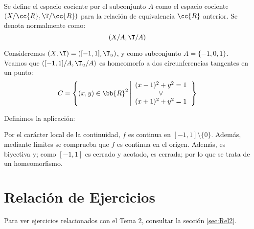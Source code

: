 \begin{ejemplo}
\begin{definicion}
        Se define el espacio cociente por el subconjunto $A$ como el espacio cociente $(X/\cc{R}, \T/\cc{R})$ para la relación de equivalencia $\cc{R}$ anterior.
        Se denota normalmente como:
        \begin{equation*}
            (X/A,\T/A)
        \end{equation*}
    \end{definicion}
    \begin{ejemplo}
        Consideremos $(X,\T)=([-1,1],\T_u)$, y como subconjunto $A=\{-1,0,1\}$. Veamos que $([-1,1]/A,\T_u/A)$ es homeomorfo a dos circunferencias tangentes en un punto:
        \begin{equation*}
            C = \left\{(x,y)\in \bb{R}^2\left|
                \begin{array}{c}
                    (x-1)^2 + y^2=1 \\ \lor \\
                    (x+1)^2 + y^2 = 1
                \end{array}
            \right.\right\}
        \end{equation*}
        \begin{figure}[H]
            \centering
        \end{figure}

        Definimos la aplicación:

        Por el carácter local de la continuidad, $f$ es continua en $[-1,1]\setminus \{0\}$. Además, mediante límites se comprueba que $f$ es continua en el origen. Además, es biyectiva y; como $[-1,1]$ es cerrado y acotado, es cerrada; por lo que se trata de un homeomorfismo.
    \end{ejemplo}
\end{ejemplo}


\section{Relación de Ejercicios}
Para ver ejercicios relacionados con el Tema 2, consultar la sección \ref{sec:Rel2}.